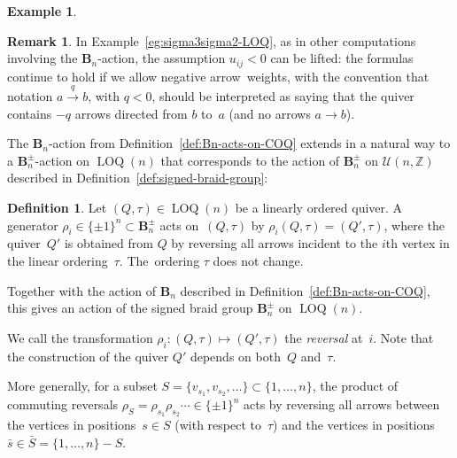 \documentclass[11pt, letterpaper]{amsart}
\newcommand{\hide}[1]{}
\theoremstyle{definition}
\newtheorem{remark}[theorem]{Remark}
\newtheorem{example}[theorem]{Example}
\newtheorem{definition}[theorem]{Definition}
\numberwithin{equation}{section}
\def\ZZ{{\mathbb Z}}
\newcommand\LOQ{\operatorname{LOQ}}
\begin{document}
\begin{example}
\hide{
Applying $\sigma_3$ to~$U'$ yields the matrix $U''=\sigma_3(\sigma_2(U))$ given by~\eqref{eq:sigma3sigma2}; 
accordingly, applying $\sigma_3$ to~$(Q',\tau')$ produces the linearly ordered quiver
$(Q'',\tau'')=\sigma_3(\sigma_2(Q,\tau))$ given by 
\vspace{2pt}
\begin{equation}
\label{eq:sigma3sigma2-LOQ}
(Q'',\tau'')\ =\ \begin{tikzcd}[arrows={-stealth}, sep=small, cramped, sep=60]
v_1 \ar[r, "-u_{13}+u_{12}u_{23}"] \ar[rr, swap, bend right=15, "-u_{14}+u_{12}u_{24}"] \ar[rrr,  bend right=30, "-u_{12}"] &    
v_3  \ar[r, "-u_{34}"] &    
v_4 &    
v_2  \ar[ll, bend left=15, "-u_{23}"] \ar[l, swap, "-u_{24}"] 
\end{tikzcd}\, . 
\vspace{-5pt}
\end{equation}
} %
\end{example}


\begin{remark}
In Example~\ref{eg:sigma3sigma2-LOQ}, as in other computations involving the $\mathbf{B}_n$-action, the assumption $u_{ij}<0$ can be lifted: 
the formulas continue to hold if we allow negative arrow~weights, 
with the convention that notation $a\stackrel{q}{\longrightarrow}b$, with $q<0$,
should be interpreted as saying that the quiver contains $-q$ arrows directed from $b$ to~$a$ (and no arrows $a\to b$).
\end{remark} 

The $\mathbf{B}_n$-action from Definition~\ref{def:Bn-acts-on-COQ}
extends in a natural way to a $\mathbf{B}_n^\pm$-action on $\LOQ(n)$
that corresponds to the action of $\mathbf{B}_n^\pm$
on $\mathcal{U}(n,\ZZ)$ described in Definition~\ref{def:signed-braid-group}: 

\begin{definition}
\label{def:quiver-reversal}
Let $(Q,\tau)\in\LOQ(n)$ be a linearly ordered quiver. 
A generator $\rho_i\in\{\pm1\}^n\subset \mathbf{B}_n^\pm$ %
acts on~$(Q,\tau)$ by $\rho_i(Q,\tau)=(Q',\tau)$, where the quiver~$Q'$ is obtained from $Q$ by
reversing all arrows incident to the $i$th vertex in the linear ordering~$\tau$. 
The~ordering $\tau$ does not change.

Together with the action of $\mathbf{B}_n$ described in Definition~\ref{def:Bn-acts-on-COQ},
this gives an action of the signed braid group $\mathbf{B}_n^\pm$ on $\LOQ(n)$. 

We call the transformation $\rho_i:(Q,\tau)\mapsto(Q',\tau)$ the \emph{reversal} at~$i$. 
Note that the construction of the quiver $Q'$ depends on both~$Q$ and~$\tau$. 

More generally, for a subset $S = \{ v_{s_1}, v_{s_2}, \dots \}\subset\{1,\dots,n\}$, 
the product of commuting reversals $\rho_S=\rho_{s_1}  \rho_{s_2}  \cdots\in\{\pm1\}^n$
acts by reversing all arrows between the vertices in positions~$s\in S$ (with respect to~$\tau$) 
and the vertices in positions $\bar s\in\bar S=\{1,\dots,n\}-S$. 
\end{definition}
\end{document}

